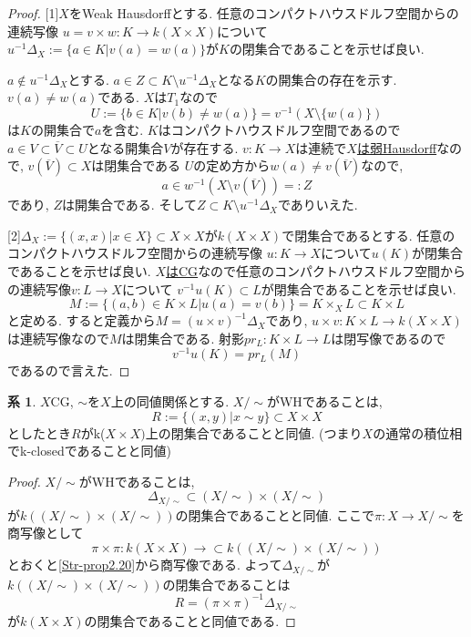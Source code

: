 \documentclass[dvipdfmx,a4paper,11pt]{report}
\theoremstyle{definition}
\newtheorem{cor}[thm]{系}
\begin{document}
\begin{proof}

[1]$X$をWeak Hausdorffとする. 
任意のコンパクトハウスドルフ空間からの連続写像
$u = v \times w : K \to k(X \times X)$について
$u^{-1}\Delta_X := \{a \in K | v(a)=w(a) \}$が$K$の閉集合であることを示せば良い.

$a \not \in u^{-1}\Delta_X$とする.
$a \in Z \subset  K \setminus u^{-1}\Delta_X$となる$K$の開集合の存在を示す.
$v(a) \neq w(a)$である. $X$は$T_1$なので
$$
U:= \{ b \in K | v(b) \neq w(a) \} = v^{-1}(X \setminus \{w(a)\})
$$
は$K$の開集合で$a$を含む.
$K$はコンパクトハウスドルフ空間であるので
$a \in V \subset \overline{V} \subset U$となる開集合$V$が存在する.
$v : K \to X$は連続で\underline{$X$は弱Hausdorff}なので, $v(\overline{V}) \subset X$は閉集合である
$U$の定め方から$w(a) \neq v(\overline{V})$なので, 
$$
a \in w^{-1}( X \setminus v(\overline{V}) ) =: Z
$$
であり,  $Z$は開集合である. 
そして$Z\subset K \setminus u^{-1}\Delta_X$でありいえた.

[2]$\Delta_X := \{ (x,x)| x \in X\}\subset X \times X$が$k(X \times X)$で閉集合であるとする. 
任意のコンパクトハウスドルフ空間からの連続写像
$u : K \to X$について$u(K)$が閉集合であることを示せば良い.
\underline{$X$はCG}なので任意のコンパクトハウスドルフ空間からの連続写像$v : L \to X$について
$v^{-1}u(K) \subset L$が閉集合であることを示せば良い.
$$
M := \{ (a,b) \in K \times L | u(a) =v(b)\}=K\times_{X}L \subset K \times L
$$
と定める. 
すると定義から$M = (u \times v)^{-1}\Delta_{X}$であり, 
$u \times v : K \times L \to k(X \times X)$は連続写像なので$M$は閉集合である. 
射影$pr_{L} : K \times L \to L$は閉写像であるので
$$
v^{-1}u(K) = pr_{L}(M)
$$
であるので言えた. 
\end{proof}

 \begin{tcolorbox}
 [colback = white, colframe = green!35!black, fonttitle = \bfseries,breakable = true]
\begin{cor}\cite[Cor2.21]{Str}
\label{Str-cor2.21}
$X$CG, $\sim$を$X$上の同値関係とする. 
$X/\sim $がWHであることは, 
$$
R:= \{ (x,y)| x \sim y\} \subset X \times X
$$
としたとき$R$がk($X \times X)$上の閉集合であることと同値.
(つまり$X$の通常の積位相でk-closedであることと同値)
\end{cor}
 \end{tcolorbox}
\begin{proof}
$X/\sim $がWHであることは,
$$
\Delta_{X/\sim} \subset (X/\sim) \times (X/\sim)
$$
が$k((X/\sim) \times (X/\sim))$の閉集合であることと同値.
ここで$\pi : X \to X/\sim$を商写像として
$$
\pi \times \pi : k(X \times X) \to \subset k((X/\sim) \times (X/\sim))
$$
とおくと\ref{Str-prop2.20}から商写像である.
よって$\Delta_{X/\sim} $が$k((X/\sim) \times (X/\sim))$の閉集合であることは
$$
R = (\pi \times \pi )^{-1}\Delta_{X/\sim} 
$$
が$ k(X \times X)$の閉集合であることと同値である.
\end{proof}
\end{document}
